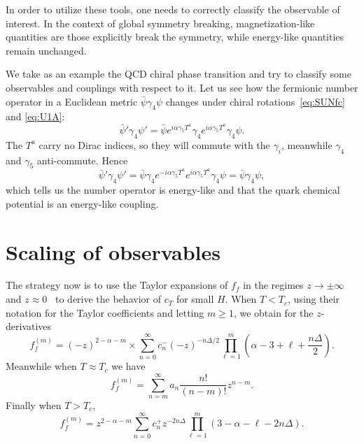 In order to utilize these tools, one needs to correctly classify the observable
of interest. In the context of global symmetry breaking, magnetization-like
quantities are those explicitly break the symmetry, while energy-like quantities
remain unchanged.

We take as an example the QCD chiral phase transition and try to classify some
observables and couplings with respect to it. Let us see how the fermionic
number operator in a Euclidean metric $\bar{\psi}\gamma_4\psi$ changes under
chiral rotations~\eqref{eq:SUNfc} and \eqref{eq:U1A}:
\begin{equation}
  \bar{\psi}'\gamma_4\psi'
    =\bar{\psi}e^{i\alpha\gamma_5T^a}\gamma_4e^{i\alpha\gamma_5T^a}\gamma_4\psi.
\end{equation}
The $T^a$ carry no Dirac indices, so they will commute with the $\gamma_i$,
meanwhile $\gamma_4$ and $\gamma_5$ anti-commute. Hence
\begin{equation}
  \bar{\psi}'\gamma_4\psi'
    =\bar{\psi}\gamma_4e^{-i\alpha\gamma_5T^a}e^{i\alpha\gamma_5T^a}\gamma_4\psi
    =\bar{\psi}\gamma_4\psi,
\end{equation}
which tells us the number operator is energy-like and that the quark chemical
potential is an energy-like coupling.

\section{Scaling of observables}


The strategy now is to use the Taylor expansions of $f_f$ in the regimes
$z\to\pm\infty$ and $z\approx 0$~\cite{Engels:2011km} to derive the
behavior of $c_T$ for small $H$. When $T<T_c$, using their
notation for the Taylor coefficients and letting $m\geq1$,
we obtain for the $z$-derivatives
\begin{equation}
    f_f^{(m)}=(-z)^{2-\alpha-m}
    \times\sum_{n=0}^\infty c_n^-(-z)^{-n\Delta/2}\prod_{\ell=1}^m\left(\alpha-3+\ell+\frac{n\Delta}{2}\right).
\end{equation}
Meanwhile when $T\approx T_c$ we have 
\begin{equation}
    f_f^{(m)}=\sum_{n=m}^\infty a_n\frac{n!}{(n-m)!}z^{n-m}.
\end{equation}
Finally when $T>T_c$,
\begin{equation}
    f_f^{(m)}=z^{2-\alpha-m}\sum_{n=0}^\infty c_n^+z^{-2n\Delta}\prod_{\ell=1}^m\left(3-\alpha-\ell-2n\Delta\right).
\end{equation}





